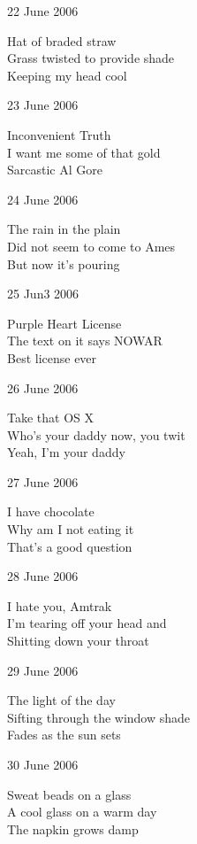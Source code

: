 \documentclass[12pt]{article}
\begin{document}
22 June 2006

Hat of braded straw \\
Grass twisted to provide shade \\
Keeping my head cool

23 June 2006

Inconvenient Truth \\
I want me some of that gold \\
Sarcastic Al Gore

24 June 2006

The rain in the plain \\
Did not seem to come to Ames \\
But now it's pouring

\newpage

25 Jun3 2006

Purple Heart License \\
The text on it says NOWAR \\
Best license ever

26 June 2006

Take that OS X \\
Who's your daddy now, you twit \\
Yeah, I'm your daddy

27 June 2006

I have chocolate \\
Why am I not eating it \\
That's a good question

28 June 2006

I hate you, Amtrak \\
I'm tearing off your head and \\
Shitting down your throat

29 June 2006 

The light of the day \\
Sifting through the window shade \\
Fades as the sun sets

30 June 2006 

Sweat beads on a glass \\
A cool glass on a warm day \\
The napkin grows damp

\newpage
\end{document}
